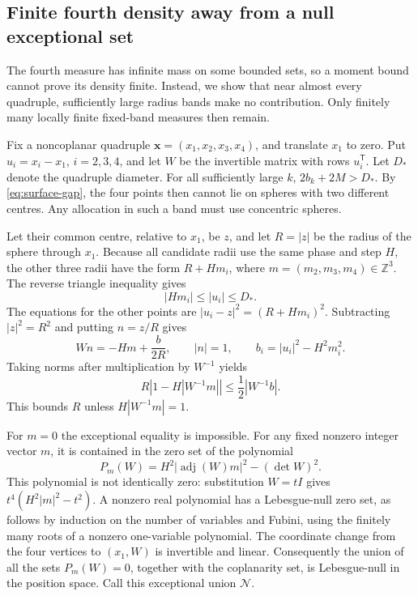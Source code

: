 \documentclass[11pt,a4paper]{article}
\numberwithin{equation}{section}
\theoremstyle{definition}
\theoremstyle{remark}
\DeclareMathOperator{\adj}{adj}
\begin{document}
\subsection{Finite fourth density away from a null exceptional set}
\label{app:radius-bound}

The fourth measure has infinite mass on some bounded sets, so a moment
bound cannot prove its density finite. Instead, we show that near almost
every quadruple, sufficiently large radius bands make no contribution.
Only finitely many locally finite fixed-band measures then remain.

Fix a noncoplanar quadruple $\mathbf x=(x_1,x_2,x_3,x_4)$, and translate
$x_1$ to zero. Put $u_i=x_i-x_1$, $i=2,3,4$, and let $W$ be the
invertible matrix with rows $u_i^{\mathsf T}$. Let $D_*$ denote the
quadruple diameter. For all sufficiently large $k$,
$2b_k+2M>D_*$. By \eqref{eq:surface-gap}, the four points then cannot
lie on spheres with two different centres. Any allocation in such a band
must use concentric spheres.

Let their common centre, relative to $x_1$, be $z$, and let $R=|z|$ be
the radius of the sphere through $x_1$. Because all candidate radii use
the same phase and step $H$, the other three radii have the form
$R+Hm_i$, where $m=(m_2,m_3,m_4)\in\mathbb Z^3$. The reverse triangle
inequality gives
\begin{equation}
 |Hm_i|\leq|u_i|\leq D_*.
 \label{eq:integer-bound}
\end{equation}
The equations for the other points are
$|u_i-z|^2=(R+Hm_i)^2$. Subtracting $|z|^2=R^2$ and putting $n=z/R$
gives
\begin{equation}
 Wn=-Hm+\frac b{2R},\qquad |n|=1,
 \qquad b_i=|u_i|^2-H^2m_i^2.
 \label{eq:concentric-equations}
\end{equation}
Taking norms after multiplication by $W^{-1}$ yields
\begin{equation}
 R\left|1-H|W^{-1}m|\right|
 \leq\frac12|W^{-1}b|.
 \label{eq:radius-bound}
\end{equation}
This bounds $R$ unless $H|W^{-1}m|=1$.

For $m=0$ the exceptional equality is impossible. For any fixed nonzero
integer vector $m$, it is contained in the zero set of the polynomial
\begin{equation}
 P_m(W)=H^2|\adj(W)m|^2-(\det W)^2.
 \label{eq:resonance-polynomial}
\end{equation}
This polynomial is not identically zero: substitution $W=tI$ gives
$t^4(H^2|m|^2-t^2)$. A nonzero real polynomial has a Lebesgue-null zero
set, as follows by induction on the number of variables and Fubini,
using the finitely many roots of a nonzero one-variable polynomial.
The coordinate change from the four vertices to $(x_1,W)$ is invertible
and linear. Consequently the union of all the sets $P_m(W)=0$, together
with the coplanarity set, is Lebesgue-null in the position space.
Call this exceptional union $\mathcal N$.
\end{document}
